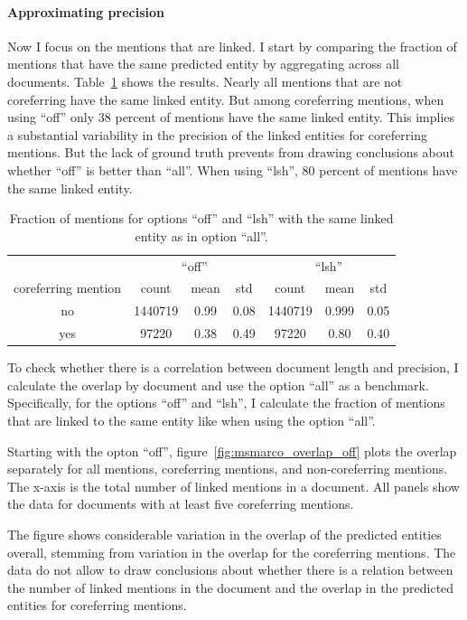 \documentclass[a4paper,11pt]{article}
\numberwithin{equation}{section} %
\begin{document}
\paragraph{Approximating precision}
Now I focus on the mentions that are linked. I start by comparing the fraction of mentions that have the same predicted entity by aggregating across all documents. Table~\ref{tab:performance_msmarco_avg} shows the results.
Nearly all mentions that are not coreferring have the same linked entity. 
But among coreferring mentions, when using ``off'' only 38 percent of mentions have the same linked entity. 
This implies a substantial variability in the precision of the linked entities for coreferring mentions. But the lack of ground truth prevents from drawing conclusions about whether ``off'' is better than ``all''. 
When using ``lsh'', 80 percent of mentions have the same linked entity.

\begin{table}
 \begin{tabular}{c c c c c c c}
 \hline
    & \multicolumn{3}{c}{``off''} & \multicolumn{3}{c}{``lsh''} \\
    \cmidrule(lr){2-4} \cmidrule(lr){5-7}
   coreferring mention & count & mean & std & count & mean & std \\
 \hline 
 no & 1440719 & 0.99 & 0.08 & 1440719 &	0.999 &	0.05 \\  
 yes & 97220 & 0.38 & 0.49 & 97220 & 0.80   &	0.40	 \\ 
\hline 
\end{tabular}
\caption{Fraction of mentions for options ``off'' and ``lsh'' with the same linked entity as in option ``all''.}
\label{tab:performance_msmarco_avg}
\end{table}

To check whether there is a correlation between document length and precision, I calculate the overlap by document and use the option ``all'' as a benchmark. Specifically, for the options ``off'' and ``lsh'', I calculate the fraction of mentions that are linked to the same entity like when using the option ``all''.

Starting with the opton ``off'', figure~\ref{fig:msmarco_overlap_off} plots the overlap separately for all mentions, coreferring mentions, and non-coreferring mentions. The x-axis is the total number of linked mentions in a document.
All panels show the data for documents with at least five coreferring mentions.

The figure shows considerable variation in the overlap of the predicted entities overall, stemming from variation in the overlap for the coreferring mentions. The data do not allow to draw conclusions about whether there is a relation between the number of linked mentions in the document and the overlap in the predicted entities for coreferring mentions.
\end{document}
